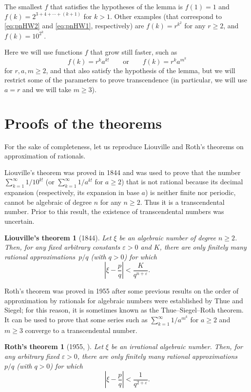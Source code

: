 \documentclass{article}
\theoremstyle{plain}
\newtheorem*{liouville}{Liouville's theorem}
\newtheorem*{roth}{Roth's theorem}
\begin{document}
The smallest $f$ that satisfies the hypotheses of the lemma is $f(1)=1$ and $f(k) = 2^{3+4+\cdots+(k+1)}$ for $k > 1$. Other examples (that correspond to \eqref{eq:pnHW2} and \eqref{eq:pnHW1}, respectively) are $f(k) = r^{k^2}$ for any $r \ge 2$, and $f(k) = 10^{2^k}$.

Here we will use functions $f$ that grow still faster, such as
\[
  f(k) = r^k a^{k!} \qquad\text{or}\qquad f(k) = r^k a^{m^k}
\]
for $r, a, m \ge 2$, and that also satisfy the hypothesis of the lemma, but we will restrict some of the parameters to prove transcendence (in particular, we will use $a=r$ and we will take $m \ge 3$).

\section{Proofs of the theorems}
\label{sec:theorems}

For the sake of completeness, let us reproduce Liouville and Roth's theorems on approximation of rationals.  

Liouville's theorem was proved in 1844 and was used to prove that the number $\sum_{k=1}^{\infty} 1/10^{k!}$ (or $\sum_{k=1}^{\infty} 1/a^{k!}$ for $a\ge2$) that is not rational because its decimal expansion (respectively, its expansion in base $a$) is neither finite nor periodic, cannot be algebraic of degree $n$ for any $n\ge2$. Thus it is a transcendental number. Prior to this result, the existence of transcendental numbers was uncertain.

\begin{liouville}[1844]
Let $\xi$ be an algebraic number of degree $n \ge 2$. Then, for any fixed arbitrary constants $\varepsilon > 0$ and $K$, there are only finitely many rational approximations~$p/q$ (with $q>0$) for which
\[
  \left| \xi - \frac{p}{q} \right| < \frac{K}{q^{n+\varepsilon}}.
\]
\end{liouville}

Roth's theorem was proved in 1955 after some previous results on the order of approximation by rationals for algebraic numbers were established by Thue and Siegel; for this reason, it is sometimes known as the Thue--Siegel--Roth theorem. It can be used to prove that some series such as $\sum_{k=1}^{\infty} {1}/{a^{m^k}}$ for $a\ge2$ and $m\ge3$ converge to a transcendental number.

\begin{roth}[1955, \cite{Roth}]
Let $\xi$ be an irrational algebraic number. Then, for any arbitrary fixed $\varepsilon > 0$, there are only finitely many rational approximations~$p/q$ (with $q>0$) for which
\[
  \left| \xi - \frac{p}{q} \right| < \frac{1}{q^{2+\varepsilon}}.
\]
\end{roth}
\end{document}
